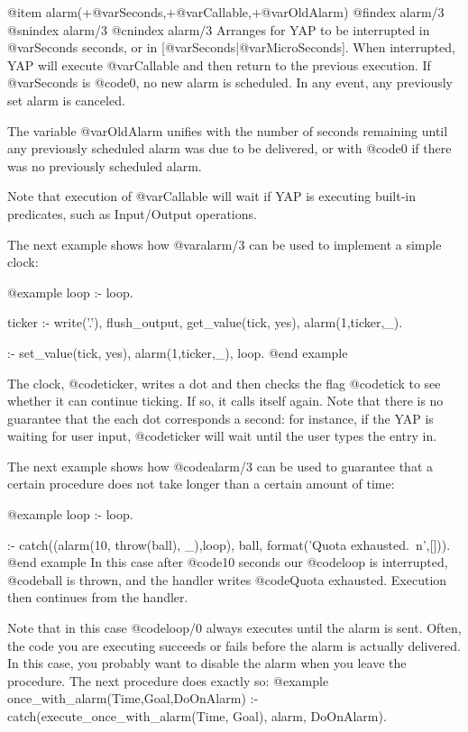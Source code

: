 {{{{{{@item alarm(+@var{Seconds},+@var{Callable},+@var{OldAlarm})
@findex alarm/3
@snindex alarm/3
@cnindex alarm/3
Arranges for YAP to be interrupted in @var{Seconds} seconds, or in
[@var{Seconds}|@var{MicroSeconds}]. When interrupted, YAP will execute
@var{Callable} and then return to the previous execution. If
@var{Seconds} is @code{0}, no new alarm is scheduled. In any event,
any previously set alarm is canceled.

The variable @var{OldAlarm} unifies with the number of seconds remaining
until any previously scheduled alarm was due to be delivered, or with
@code{0} if there was no previously scheduled alarm.

Note that execution of @var{Callable} will wait if YAP is
executing built-in predicates, such as Input/Output operations.

The next example shows how @var{alarm/3} can be used to implement a
simple clock:

@example
loop :- loop.

ticker :- write('.'), flush_output,
          get_value(tick, yes),
          alarm(1,ticker,_).

:- set_value(tick, yes), alarm(1,ticker,_), loop.
@end example

The clock, @code{ticker}, writes a dot and then checks the flag
@code{tick} to see whether it can continue ticking. If so, it calls
itself again. Note that there is no guarantee that the each dot
corresponds a second: for instance, if the YAP is waiting for
user input, @code{ticker} will wait until the user types the entry in.

The next example shows how @code{alarm/3} can be used to guarantee that
a certain procedure does not take longer than a certain amount of time:

@example
loop :- loop.

:-   catch((alarm(10, throw(ball), _),loop),
        ball,
        format('Quota exhausted.~n',[])).
@end example
In this case after @code{10} seconds our @code{loop} is interrupted,
@code{ball} is thrown,  and the handler writes @code{Quota exhausted}.
Execution then continues from the handler.

Note that in this case @code{loop/0} always executes until the alarm is
sent. Often, the code you are executing succeeds or fails before the
alarm is actually delivered. In this case, you probably want to disable
the alarm when you leave the procedure. The next procedure does exactly so:
@example
once_with_alarm(Time,Goal,DoOnAlarm) :-
   catch(execute_once_with_alarm(Time, Goal), alarm, DoOnAlarm).

}}}}}}
